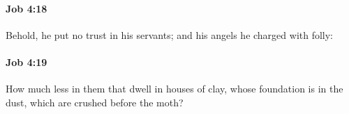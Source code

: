 		\paragraph{Job 4:18} %
			\label{JOB-4-18}

			Behold, he put no trust in his servants; and his angels he charged with folly:


		\paragraph{Job 4:19} %
			\label{JOB-4-19}

			How much less in them that dwell in houses of clay, whose foundation is in the dust, which are crushed before the moth?


